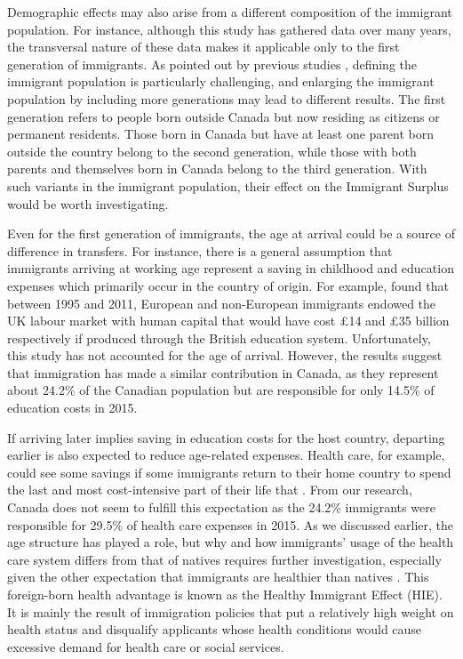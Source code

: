 \vspace{0.7em}\par
Demographic effects may also arise from a different composition of the immigrant population.
For instance, although this study has gathered data over many years, the transversal nature of these data makes it applicable only to the first generation of immigrants.
As pointed out by previous studies \citep{Lee:1998fs}, defining the immigrant population is particularly challenging, and enlarging the immigrant population by including more generations may lead to different results.
The first generation refers to people born outside Canada but now residing as citizens or permanent residents.
Those born in Canada but have at least one parent born outside the country belong to the second generation, while those with both parents and themselves born in Canada belong to the third generation.
With such variants in the immigrant population, their effect on the Immigrant Surplus would be worth investigating.

\vspace{0.7em}\par
Even for the first generation of immigrants, the age at arrival could be a source of difference in transfers.
For instance, there is a general assumption that immigrants arriving at working age represent a saving in childhood and education expenses which primarily occur in the country of origin.
For example, \citet{Dustmann:2014dr} found that between 1995 and 2011, European and non-European immigrants endowed the UK labour market with human capital that would have cost \pounds14 and \pounds35 billion respectively if produced through the British education system.
Unfortunately, this study has not accounted for the age of arrival.
However, the results suggest that immigration has made a similar contribution in Canada, as they represent about 24.2\% of the Canadian population but are responsible for only 14.5\% of education costs in 2015.


\vspace{0.7em}\par
If arriving later implies saving in education costs for the host country, departing earlier is also expected to reduce age-related expenses.
Health care, for example, could see some savings if some immigrants return to their home country to spend the last and most cost-intensive part of their life that \citep{Bratsberg:2014cl}.
From our research, Canada does not seem to fulfill this expectation as the 24.2\% immigrants were responsible for 29.5\% of health care expenses in 2015.
As we discussed earlier, the age structure has played a role, but why and how immigrants' usage of the health care system differs from that of natives requires further investigation, especially given the other expectation that immigrants are healthier than natives \citep{Ichou:2019ik,Vang:2016di}.
This foreign-born health advantage is known as the Healthy Immigrant Effect (HIE). It is mainly the result of immigration policies that put a relatively high weight on health status and disqualify applicants whose health conditions would cause excessive demand for health care or social services.


